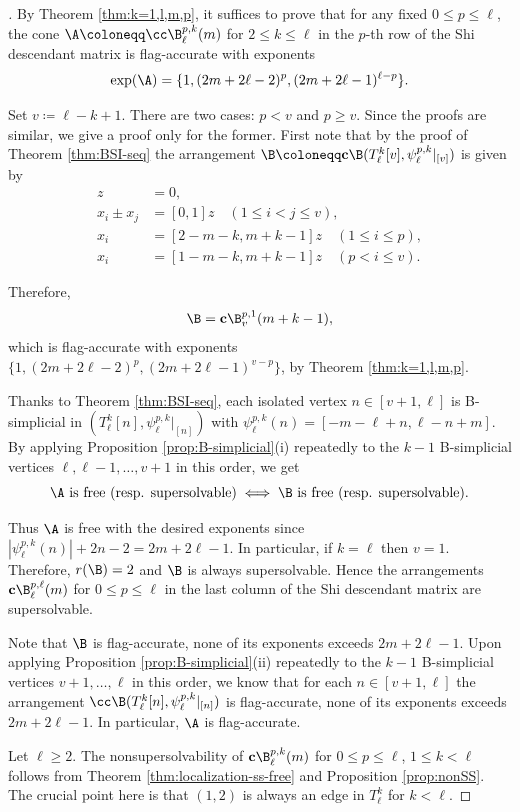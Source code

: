 \begin{proof}[]
By Theorem \ref{thm:k=1,l,m,p}, it suffices to prove that for any fixed $0 \le p \le \ell$, the cone  $\A \coloneqq \cc\B^{p,k}_\ell(m)$  for $2 \le k \le \ell$  in the $p$-th row of the Shi descendant matrix is flag-accurate with exponents  
$$\exp(\A) = \{1, (2m+2\ell-2)^{p}, (2m+2\ell-1)^{\ell-p}\} .$$ 

Set $ v  \coloneqq  \ell-k+1$. 
There are two cases: $p < v$ and  $p \ge v$. 
Since the proofs are similar, we give a proof only for the former. 
First note that by the proof of Theorem \ref{thm:BSI-seq} the arrangement $\B  \coloneqq  \textbf{c} \B(T_{\ell}^{k}[v], \psi_{\ell}^{p, k}|_{[v]})$ is given by 
\begin{align*}
z &= 0 , \\
x_{i}\pm x_{j} &= [0,1]z \quad  (1 \leq i < j \leq v), \\
x_i&=  [2-m-k , m+k-1]z \quad (1 \leq   i \leq p), \\
x_i&= [1-m-k , m+k-1]z   \quad (p<  i \leq v).
\end{align*}

Therefore, 
$$\B= \textbf{c}\B^{p,1}_{v}(m+k-1),$$
which is  flag-accurate with exponents  $  \{1, (2m+2\ell-2)^{p}, (2m+2\ell-1)^{ v-p}\}$, by Theorem \ref{thm:k=1,l,m,p}. 

Thanks to Theorem \ref{thm:BSI-seq}, each isolated vertex $n \in [v+1, \ell] $ is  B-simplicial in  $ (T_{\ell}^{k}[n], \psi_{\ell}^{p,k}|_{[n]})$ with $ \psi_{\ell}^{p,k}(n) = [-m-\ell+n, \ell-n+m]$. 
By applying Proposition \ref{prop:B-simplicial}(i) repeatedly to the $k-1$ B-simplicial vertices $\ell ,\ell-1, \ldots, v+1 $ in this order, we get  
$$ \A \mbox{ is free (resp. supersolvable)} \iff  \B  \mbox{ is free (resp. supersolvable)}  .$$  

Thus   $ \A$ is free with the desired exponents since  $| \psi_{\ell}^{p,k}(n) |+2n-2 =2m+2\ell-1 $. 
In particular, if $k=\ell$ then $v=1$. 
Therefore, $r(\B)=2$ and $\B$ is always supersolvable. 
Hence  the arrangements $\textbf{c} \B^{p,\ell}_\ell(m)$ for $0 \le p \le \ell$ in the last column of the Shi descendant matrix are supersolvable. 

Note that $\B$ is flag-accurate, none of its exponents exceeds $2m+2\ell-1 $. 
Upon applying Proposition \ref{prop:B-simplicial}(ii) repeatedly to the $k-1$ B-simplicial vertices $v+1 , \ldots, \ell $ in this order, we know that for each $n \in [v+1, \ell] $ the arrangement $\cc\B  (T_{\ell}^{k}[n], \psi_{\ell}^{p,k}|_{[n]}) $ is flag-accurate, none of its exponents exceeds $2m+2\ell-1 $. 
In particular, $ \A$ is  flag-accurate. 

Let $\ell \ge 2$. 
The nonsupersolvability of $ \mathbf{c}\B^{p,k}_\ell(m)$ for $0 \le p \le \ell$, $1 \le k < \ell$ follows from Theorem \ref{thm:localization-ss-free} and Proposition \ref{prop:nonSS}. The crucial point here is that $(1,2)$ is always an edge in $T_{\ell}^{k}$ for $ k < \ell $. 
\end{proof}

